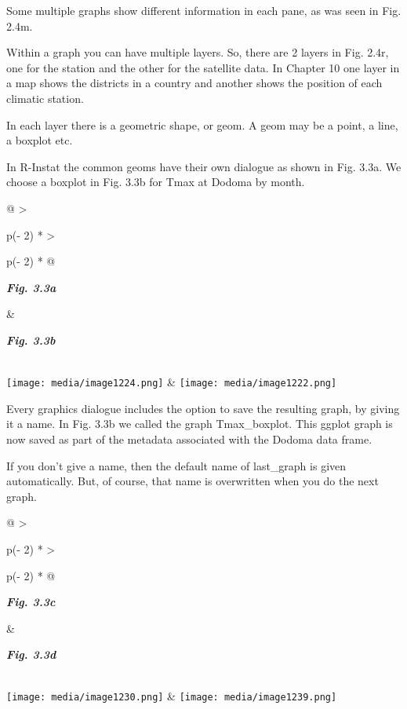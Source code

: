 \documentclass[
  letterpaper,
  DIV=11,
  numbers=noendperiod]{scrreprt}
\begin{document}
Some multiple graphs show different information in each pane, as was
seen in Fig. 2.4m.

Within a graph you can have multiple layers. So, there are 2 layers in
Fig. 2.4r, one for the station and the other for the satellite data. In
Chapter 10 one layer in a map shows the districts in a country and
another shows the position of each climatic station.

In each layer there is a geometric shape, or geom. A geom may be a
point, a line, a boxplot etc.

In R-Instat the common geoms have their own dialogue as shown in Fig.
3.3a. We choose a boxplot in Fig. 3.3b for Tmax at Dodoma by month.

\begin{longtable}[]{@{}
  >{\raggedright\arraybackslash}p{(\columnwidth - 2\tabcolsep) * }
  >{\raggedright\arraybackslash}p{(\columnwidth - 2\tabcolsep) * }@{}}
\toprule\noalign{}
\begin{minipage}[b]{\linewidth}\raggedright
\textbf{\emph{Fig. 3.3a}}
\end{minipage} & \begin{minipage}[b]{\linewidth}\raggedright
\textbf{\emph{Fig. 3.3b}}
\end{minipage} \\
\midrule\noalign{}
\endhead
\bottomrule\noalign{}
\endlastfoot
\texttt{[image: media/image1224.png]}
&
\texttt{[image: media/image1222.png]} \\
\end{longtable}

Every graphics dialogue includes the option to save the resulting graph,
by giving it a name. In Fig. 3.3b we called the graph Tmax\_boxplot.
This ggplot graph is now saved as part of the metadata associated with
the Dodoma data frame.

If you don't give a name, then the default name of last\_graph is given
automatically. But, of course, that name is overwritten when you do the
next graph.

\begin{longtable}[]{@{}
  >{\raggedright\arraybackslash}p{(\columnwidth - 2\tabcolsep) * }
  >{\raggedright\arraybackslash}p{(\columnwidth - 2\tabcolsep) * }@{}}
\toprule\noalign{}
\begin{minipage}[b]{\linewidth}\raggedright
\textbf{\emph{Fig. 3.3c}}
\end{minipage} & \begin{minipage}[b]{\linewidth}\raggedright
\textbf{\emph{Fig. 3.3d}}
\end{minipage} \\
\midrule\noalign{}
\endhead
\bottomrule\noalign{}
\endlastfoot
\texttt{[image: media/image1230.png]}
&
\texttt{[image: media/image1239.png]} \\
\end{longtable}
\end{document}
